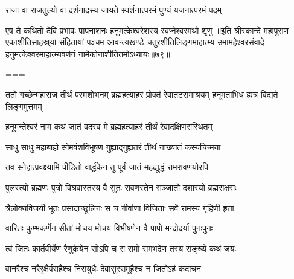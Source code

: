 \twolineshloka
{राजा वा राजतुल्यो वा दर्शनादस्य जायते}
{स्पर्शनात्परमं पुण्यं यजनात्परमं पदम्}%

\twolineshloka
{एष ते कथितो देवि प्रभावः पापनाशनः}
{हनुमत्केश्वरेशस्य स्वप्नेश्वरमथो शृणु}%
॥इति श्रीस्कान्दे महापुराण एकाशीतिसाहस्र्यां संहितायां पञ्चम आवन्त्यखण्डे चतुरशीतिलिङ्गमाहात्म्य उमामहेश्वरसंवादे हनुमत्केश्वरमाहात्म्यवर्णनं नामैकोनाशीतितमोऽध्यायः॥७९॥

===


\vakta{}
\shrota{}
\tags{}
\notes{}

\storymeta






\threelineshloka
{ततो गच्छेन्महाराज तीर्थं परमशोभनम्}
{ब्रह्महत्याहरं प्रोक्तं रेवातटसमाश्रयम्}
{हनूमताभिधं ह्यत्र विद्यते लिङ्गमुत्तमम्}%


\twolineshloka
{हनूमन्तेश्वरं नाम कथं जातं वदस्व मे}
{ब्रह्महत्याहरं तीर्थं रेवादक्षिणसंस्थितम्}%


\twolineshloka
{साधु साधु महाबाहो सोमवंशविभूषण}
{गुह्याद्गुह्यतरं तीर्थं नाख्यातं कस्यचिन्मया}%

\twolineshloka
{तव स्नेहात्प्रवक्ष्यामि पीडितो वार्द्धकेन तु}
{पूर्वं जातं महद्युद्धं रामरावणयोरपि}%

\twolineshloka
{पुलस्त्यो ब्रह्मणः पुत्रो विश्रवास्तस्य वै सुतः}
{रावणस्तेन सञ्जातो दशास्यो ब्रह्मराक्षसः}%

\twolineshloka
{त्रैलोक्यविजयी भूतः प्रसादाच्छूलिनः स च}
{गीर्वाणा विजिताः सर्वे रामस्य गृहिणी हृता}%

\twolineshloka
{वारितः कुम्भकर्णेन सीतां मोचय मोचय}
{विभीषणेन वै पापो मन्दोदर्या पुनःपुनः}%

\twolineshloka
{त्वं जितः कार्तवीर्येण रैणुकेयेन सोऽपि च}
{स रामो रामभद्रेण तस्य सङ्ख्ये कथं जयः}%


\twolineshloka
{वानरैश्च नरैरृक्षैर्वराहैश्च निरायुधैः}
{देवासुरसमूहैश्च न जितोऽहं कदाचन}%

